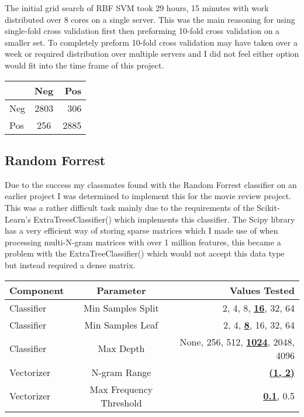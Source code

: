 \documentclass[11pt]{article}
\begin{document}
The initial grid search of RBF SVM took 29 hours, 15 minutes with work distributed over 8 cores on a single server. This was the main reasoning for using single-fold cross validation first then preforming 10-fold cross validation on a smaller set. To completely preform 10-fold cross validation may have taken over a week or required distribution over multiple servers and I did not feel either option would fit into the time frame of this project.

\begin{center}
	 \label{cm_rbf}
	\begin{tabular}{ l | c | r } \hline
		& 	Neg  	& Pos\\ \hline
	Neg &	2803	& 306 \\
	Pos &	256		& 2885
	\end{tabular}
\end{center}


\subsection{Random Forrest}
Due to the success my classmates found with the Random Forrest classifier on an earlier project I was determined to implement this for the movie review project. This was a rather difficult task mainly due to the requirements of the Scikit-Learn's ExtraTreesClassifier()\cite{ExtraTreesClassifier} which implements this classifier. The Scipy library has a very efficient way of storing sparse matrices which I made use of when processing multi-N-gram matrices with over 1 million features, this became a problem with the ExtraTreeClassifier() which would not accept this data type but instead required a dense matrix.

\begin{center}
	 \label{params_extree}
	\begin{tabular}{ l | c | r } \hline
	Component & Parameter  & Values Tested\\ \hline
	Classifier &	Min Samples Split	& 2, 4, 8, \textbf{\underline{16}}, 32, 64\\
	Classifier &	Min Samples Leaf	& 2, 4, \textbf{\underline{8}}, 16, 32, 64\\	
	Classifier &	Max Depth			& None, 256, 512, \textbf{\underline{1024}}, 2048, 4096\\
	Vectorizer &	N-gram Range 		& \textbf{\underline{(1, 2)}}\\
	Vectorizer & 	Max Frequency Threshold	& 	\textbf{\underline{0.1}}, 0.5\\
	\end{tabular}
\end{center}
\end{document}
